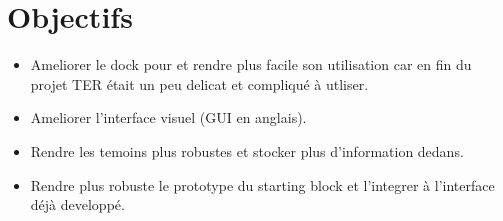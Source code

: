 \documentclass[12pt]{article}
\begin{document}

\section{Objectifs}
\begin{itemize}
	\item Ameliorer le dock pour et rendre plus facile son
	utilisation car en fin du projet TER \'etait un 
	peu delicat et compliqu\'e \`a utliser.
	\item Ameliorer l'interface visuel (GUI en anglais).
	\item Rendre les temoins plus robustes et stocker plus
	d'information dedans.
	\item Rendre plus robuste le prototype du starting block
	et l'integrer \`a l'interface d\'ej\`a developp\'e.
\end{itemize}
\end{document}
